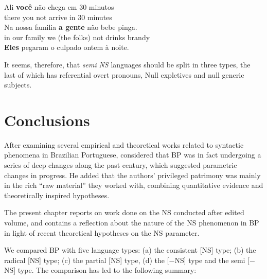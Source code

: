 \documentclass[output=paper]{langsci/langscibook}
\begin{document}
\ea%
    \label{ex:26.52}
    \ea
    \gll    Ali    \textbf{você} não chega em 30 minutos\\
            there you  not  arrive in 30 minutes\\
    \ex
    \gll    Na nossa familia \textbf{a gente }              não bebe pinga.\\
            in   our family {we (the folks)}  not drinks brandy\\
    \ex     \textbf{Eles} pegaram o culpado ontem à noite.
    \z
\z

It seems, therefore, that \emph{semi} \emph{NS} languages should be split in
three types, the last of which has referential overt pronouns, Null expletives
and null generic subjects.

\section{Conclusions}\label{sec:26.4}

After examining several empirical and theoretical works related to syntactic
phenomena in Brazilian Portuguese, \citet[411]{Roberts1993b} considered that
\gls{BP} was in fact undergoing a series of deep
changes along the past century, which suggested parametric changes in progress.
He added that the authors’ privileged patrimony was mainly in the rich “raw
material” they worked with, combining quantitative evidence and theoretically
inspired hypotheses.

The present chapter reports on work done on the NS conducted after
 edited volume, and contains a reflection about the nature
of the NS phenomenon in \gls{BP} in light of recent
theoretical hypotheses on the NS parameter.

We compared \gls{BP} with five language types: (a) the
consistent [NS] type; (b) the radical [NS] type; (c) the partial [NS] type, (d)
the [$-$NS] type and the semi [$-$NS] type.  The comparison has led to the
following summary:
\end{document}
